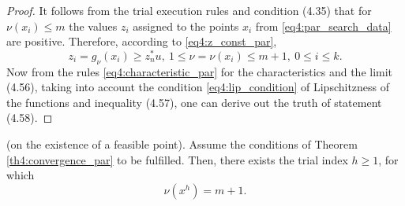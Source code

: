 \documentclass[graybox]{svmult}
\begin{document}
\begin{proof}
  It follows from the trial execution rules and condition (4.35) that for $\nu(x_i )\le m$ the values $z_i$ assigned to the points $x_i$ from \eqref{eq4:par_search_data} are positive. Therefore, according to \eqref{eq4:z_const_par},
  \begin{displaymath}
    z_i=g_\nu(x_i)\ge z^*_nu,\:1\le\nu=\nu(x_i)\le m+1,\: 0\le i\le k.
  \end{displaymath}
    Now from the rules \eqref{eq4:characteristic_par} for the characteristics and the limit (4.56), taking into account the condition \eqref{eq4:lip_condition} of Lipschitzness of the functions and inequality (4.57), one can derive out the truth of statement (4.58).
\end{proof}
\begin{lemma}
  (on the existence of a feasible point). Assume the conditions of Theorem \ref{th4:convergence_par} to be fulfilled. Then, there exists the trial index $h\ge 1$, for which
  \begin{equation}
    \label{eq4:62}
    \nu(x^h)=m+1.
  \end{equation}
\end{lemma}
\end{document}
